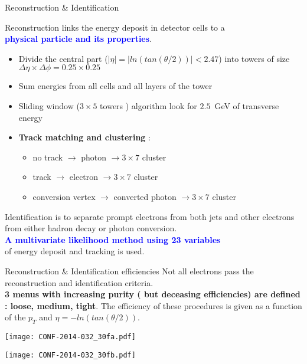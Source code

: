 \begin{frame}{Reconstruction \& Identification}
  \begin{center}
    Reconstruction links the energy deposit in detector cells to a \\ \textcolor{blue}{\bf physical particle and its properties}.
    \vfill
    \begin{itemize}
    \item Divide the central part ($|\eta|=|ln(tan(\theta /2) )|<2.47$) into towers of size $\Delta\eta\times\Delta\phi =0.25\times 0.25$
    \item Sum energies from all cells and all layers of the tower
    \item Sliding window ($3 \times 5$ towers ) algorithm look for $2.5$~GeV of transverse energy
    \item {\bf Track matching and clustering} :\\
      \begin{itemize}
      \item no track $\rightarrow$ photon $\rightarrow 3\times 7$ cluster 
      \item track $\rightarrow$ electron $\rightarrow 3\times 7$ cluster 
      \item conversion vertex $\rightarrow$ converted photon $\rightarrow 3\times 7$ cluster
      \end{itemize}
    \end{itemize}
    \vfill
    Identification is to separate prompt electrons from both jets and other electrons from either hadron decay or photon conversion.\\
    \textcolor{blue}{\bf A multivariate likelihood method using  23 variables} \\of energy deposit and tracking is used.
  \end{center}
\end{frame}


\begin{frame}{Reconstruction \& Identification efficiencies}
  Not all electrons pass the reconstruction and identification criteria. \\
  {\bf 3 menus with increasing purity ( but deceasing efficiencies) are defined : loose, medium, tight}.
  The efficiency of these procedures is given as a function of the $p_T$ and $\eta=-ln(tan(\theta/2))$.\\
\begin{minipage}{0.49\linewidth}
  \texttt{[image: CONF-2014-032\_30fa.pdf]}
\end{minipage}
\begin{minipage}{0.49\linewidth}
  \texttt{[image: CONF-2014-032\_30fb.pdf]}
\end{minipage}
\end{frame}

